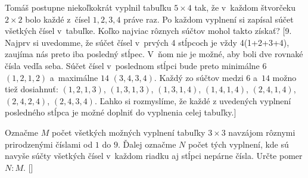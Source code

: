 {Tomáš postupne niekoľkokrát vyplnil tabuľku $5\times4$
tak, že v~každom štvorčeku $2 \times2$
bolo každé z~čísel $1, 2, 3, 4$ práve raz.
Po každom vyplnení si zapísal súčet všetkých čísel v~tabuľke. Koľko najviac rôznych súčtov mohol takto získať?
[9. Najprv si uvedomme, že súčet čísel v~prvých 4 stĺpcoch je vždy 4(1+2+3+4), zaujíma nás preto iba posledný stĺpec. V~ňom nie je možné, aby boli dve rovnaké čísla vedľa seba. Súčet čísel v~poslednom stĺpci bude preto minimálne $6$ $(1,2,1,2)$ a~maximálne $14$ $(3,4,3,4)$. Každý zo súčtov medzi $6$ a~$14$ možno tiež dosiahnuť: $(1,2,1,3)$, $(1,3,1,3)$, $(1,3,1,4)$, $(1,4,1,4)$, $(2,4,1,4)$, $(2,4,2,4)$, $(2,4,3,4)$. Ľahko si rozmyslíme, že každé z uvedených vyplnení posledného stĺpca je možné doplniť do vyplnenia celej tabuľky.]


Označme $M$ počet všetkých možných vyplnení tabuľky $3\times 3$ navzájom rôznymi prirodzenými číslami od $1$ do $9$.
Ďalej označme $N$ počet tých vyplnení, kde sú navyše súčty všetkých čísel v~každom riadku aj stĺpci nepárne čísla. Určte pomer $N:M$.
[]


}

